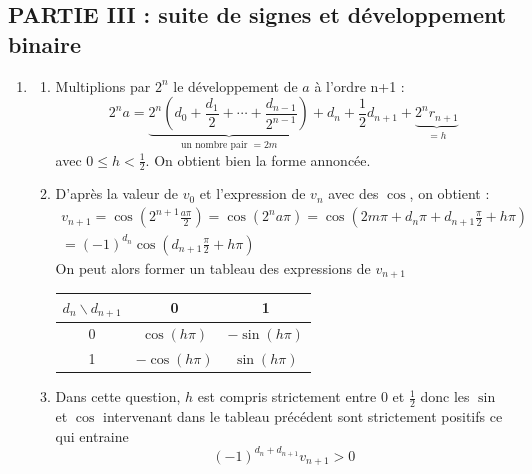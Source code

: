 \subsection*{PARTIE III : suite de signes et développement binaire}
\begin{enumerate}
 \item
\begin{enumerate}
 \item Multiplions par $2^{n}$ le développement de $a$ à l'ordre n+1 :
\begin{displaymath}
 2^{n}a = \underset{\text{un nombre pair }= 2m}{\underbrace{2^{n}\left(d_0 + \frac{d_1}{2}+\cdots+\frac{d_{n-1}}{2^{n-1}} \right)}}
+ d_n + \frac{1}{2}d_{n+1}+
\underset{= h}{\underbrace{2^{n}r_{n+1}}} 
\end{displaymath}
avec $0\leq h < \frac{1}{2}$. On obtient bien la forme annoncée.
 \item D'après la valeur de $v_0$ et l'expression de $v_n$ avec des $\cos$, on obtient :
\begin{multline*}
 v_{n+1} = \cos(2^{n+1}\frac{a\pi}{2})= \cos(2^na\pi)
=\cos(2m\pi +d_n\pi + d_{n+1}\frac{\pi}{2} + h\pi)\\
= (-1)^{d_n}\cos(d_{n+1}\frac{\pi}{2} + h\pi)
\end{multline*}
On peut alors former un tableau des expressions de $v_{n+1}$
\begin{center}
\renewcommand{\arraystretch}{1.5}
\begin{tabular}{|c|c|c|} \hline
$d_n \backslash d_{n+1}$ & 0             & 1             \\ \hline
0                        & $\cos(h\pi)$  & $-\sin(h\pi)$ \\ \hline
1                        & $-\cos(h\pi)$ & $\sin(h\pi)$  \\ \hline
\end{tabular}
\end{center}

 \item Dans cette question, $h$ est compris strictement entre $0$ et $\frac{1}{2}$ donc les $\sin$ et $\cos$ intervenant dans le tableau précédent sont strictement positifs ce qui entraine
\begin{displaymath}
 (-1)^{d_n+d_{n+1}}v_{n+1}>0
\end{displaymath}

\end{enumerate}


\end{enumerate}
